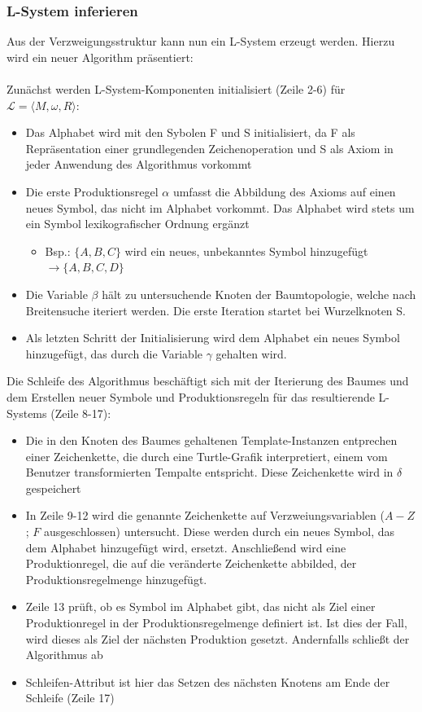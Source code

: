 \subsubsection*{L-System inferieren}
Aus der Verzweigungsstruktur kann nun ein L-System erzeugt werden.
Hierzu wird ein neuer Algorithm präsentiert:\\~\\
Zunächst werden L-System-Komponenten initialisiert (Zeile 2-6) für $\mathcal{L}=\langle M,\omega,R \rangle$:
\begin{itemize}
    \item Das Alphabet wird mit den Sybolen F und S initialisiert, da F als Repräsentation einer grundlegenden
    Zeichenoperation und S als Axiom in jeder Anwendung des Algorithmus vorkommt
    \item Die erste Produktionsregel $\alpha$ umfasst die Abbildung des Axioms auf einen neues Symbol, das nicht im Alphabet
    vorkommt. Das Alphabet wird stets um ein Symbol lexikografischer Ordnung ergänzt
    \begin{itemize}
        \item Bsp.: $\{A,B,C\}$ wird ein neues, unbekanntes Symbol hinzugefügt $\rightarrow \{A,B,C,D\}$
    \end{itemize}
    \item Die Variable $\beta$ hält zu untersuchende Knoten der Baumtopologie, welche nach Breitensuche iteriert werden.
    Die erste Iteration startet bei Wurzelknoten S.
    \item Als letzten Schritt der Initialisierung wird dem Alphabet ein neues Symbol hinzugefügt, das durch die Variable
    $\gamma$ gehalten wird.
\end{itemize}
Die Schleife des Algorithmus beschäftigt sich mit der Iterierung des Baumes und dem Erstellen neuer Symbole und
Produktionsregeln für das resultierende L-Systems (Zeile 8-17):
\begin{itemize}
    \item Die in den Knoten des Baumes gehaltenen Template-Instanzen entprechen einer Zeichenkette, die durch eine
    Turtle-Grafik interpretiert, einem vom Benutzer transformierten Tempalte entspricht. Diese Zeichenkette wird in
    $\delta$ gespeichert
    \item In Zeile 9-12 wird die genannte Zeichenkette auf Verzweiungsvariablen ($A-Z$; $F$ ausgeschlossen) untersucht.
    Diese werden durch ein neues Symbol, das dem Alphabet hinzugefügt wird, ersetzt. Anschließend wird eine Produktionregel,
    die auf die veränderte Zeichenkette abbilded, der Produktionsregelmenge hinzugefügt.
    \item Zeile 13 prüft, ob es Symbol im Alphabet gibt, das nicht als Ziel einer Produktionregel in der Produktionsregelmenge
    definiert ist. Ist dies der Fall, wird dieses als Ziel der nächsten Produktion gesetzt. Andernfalls schließt der
    Algorithmus ab
    \item Schleifen-Attribut ist hier das Setzen des nächsten Knotens am Ende der Schleife (Zeile 17)
\end{itemize}

